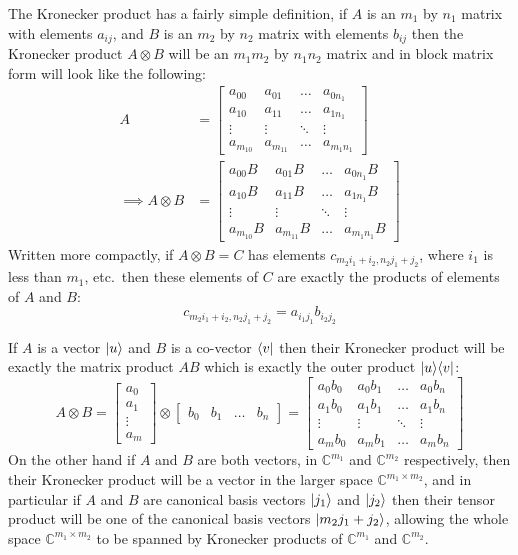 The Kronecker product has a fairly simple definition, if $A$ is an $m_1$ by $n_1$ matrix with elements $a_{ij}$, and $B$ is an $m_2$ by $n_2$ matrix with elements $b_{ij}$ then the Kronecker product $A \otimes B$ will be an $m_1m_2$ by $n_1n_2$ matrix and in block matrix form will look like the following:
\begin{align*}
A &= \left[\begin{matrix}
a_{00} & a_{01} & \dots & a_{0n_1}\\
a_{10} & a_{11} & \dots & a_{1n_1}\\
\vdots & \vdots & \ddots & \vdots\\
a_{m_10} & a_{m_11} & \dots & a_{m_1n_1}
\end{matrix}\right]
\\\implies A\otimes B &= \left[\begin{matrix}
a_{00}B & a_{01}B & \dots & a_{0n_1}B\\
a_{10}B & a_{11}B & \dots & a_{1n_1}B\\
\vdots & \vdots & \ddots & \vdots\\
a_{m_10}B & a_{m_11}B & \dots & a_{m_1n_1}B
\end{matrix}\right]
\end{align*}
Written more compactly, if $A\otimes B = C$ has elements $c_{m_2i_1 + i_2,n_2j_1+j_2}$, where $i_1$ is less than $m_1$, etc.\ then these elements of $C$ are exactly the products of elements of $A$ and $B$:
\[c_{m_2i_1 + i_2,n_2j_1+j_2} = a_{i_1j_1}b_{i_2j_2}\]

If $A$ is a vector $| u \rangle$ and $B$ is a co-vector $\langle v |$ then their Kronecker product will be exactly the matrix product $AB$ which is exactly the outer product $| u \rangle\langle v |$:
\[
A \otimes B =
\left[\begin{matrix}
a_0\\a_1\\\vdots\\a_m
\end{matrix}\right]
\otimes
\left[\begin{matrix}
b_0&b_1&\dots&b_n
\end{matrix}\right]
=
\left[\begin{matrix}
a_0b_0 & a_0b_1 & \dots & a_0b_n\\
a_1b_0 & a_1b_1 & \dots & a_1b_n\\
\vdots & \vdots & \ddots & \vdots\\
a_mb_0 & a_mb_1 & \dots & a_mb_n
\end{matrix}\right]
\]
On the other hand if $A$ and $B$ are both vectors, in $\mathbb{C}^{m_1}$ and $\mathbb{C}^{m_2}$ respectively, then their Kronecker product will be a vector in the larger space $\mathbb{C}^{m_1\times m_2}$, and in particular if $A$ and $B$ are canonical basis vectors $| j_1 \rangle$ and $| j_2 \rangle$ then their tensor product will be one of the canonical basis vectors $| m_2j_1 + j_2 \rangle$, allowing the whole space $\mathbb{C}^{m_1 \times m_2}$ to be spanned by Kronecker products of $\mathbb{C}^{m_1}$ and $\mathbb{C}^{m_2}$.


